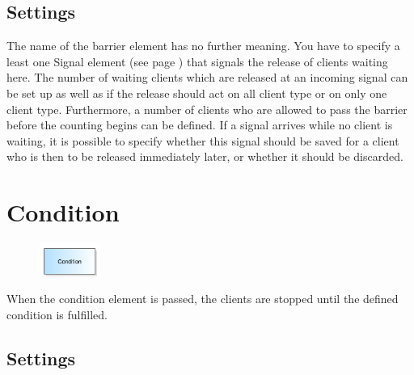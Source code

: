 \subsection*{Settings}

The name of the barrier element has no further meaning. You have to specify a least one
Signal element (see page \pageref{ref:ModelElementSignal}) that signals the release of clients waiting here.
The number of waiting clients which are released at an incoming signal can be set up as well as
if the release should act on all client type or on only one client type.
Furthermore, a number of clients who are allowed to pass the barrier before the counting begins
can be defined. If a signal arrives while no client is waiting, it is possible to specify whether
this signal should be saved for a client who is then to be released immediately later, or whether
it should be discarded.


\section{Condition}
\label{ref:ModelElementHold}

\begin{figure}
\vspace{-22pt}
\includegraphics[width=2cm]{imageModelElementHold.png}
\vspace{-22pt}
\end{figure}

When the condition element is passed, the clients are stopped until the defined condition is fulfilled. 

\subsection*{Settings}

